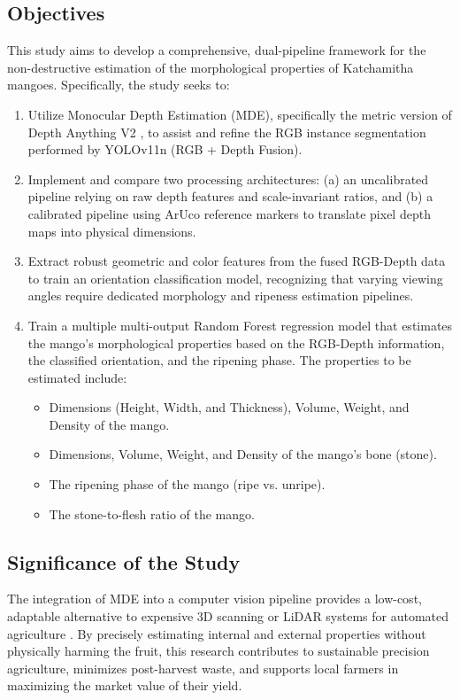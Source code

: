 \subsection{Objectives}
This study aims to develop a comprehensive, dual-pipeline framework for the non-destructive estimation of the morphological properties of Katchamitha mangoes. Specifically, the study seeks to:
\begin{enumerate}
    \item Utilize Monocular Depth Estimation (MDE), specifically the metric version of
    Depth Anything V2 \cite{depth_anything_v2}, to assist and refine the RGB instance
    segmentation performed by YOLOv11n (RGB + Depth Fusion).
    \item Implement and compare two processing architectures: (a) an uncalibrated
    pipeline relying on raw depth features and scale-invariant ratios, and (b) a
    calibrated pipeline using ArUco reference markers to translate pixel depth maps
    into physical dimensions.
    \item Extract robust geometric and color features from the fused RGB-Depth data
    to train an orientation classification model, recognizing that varying viewing
    angles require dedicated morphology and ripeness estimation pipelines.
    \item Train a multiple multi-output Random Forest regression model that
    estimates the mango's morphological properties based on the RGB-Depth
    information, the classified orientation, and the ripening phase. The
    properties to be estimated include:
    \begin{itemize}
        \item Dimensions (Height, Width, and Thickness), Volume, Weight, and Density of the mango.
        \item Dimensions, Volume, Weight, and Density of the mango's bone (stone).
        \item The ripening phase of the mango (ripe vs. unripe).
        \item The stone-to-flesh ratio of the mango.
    \end{itemize}
\end{enumerate}

\subsection{Significance of the Study}
The integration of MDE into a computer vision pipeline provides a low-cost,
adaptable alternative to expensive 3D scanning or LiDAR systems for automated
agriculture \cite{depthanythingv2}. By precisely estimating internal and external
properties without physically harming the fruit, this research contributes to
sustainable precision agriculture, minimizes post-harvest waste, and supports
local farmers in maximizing the market value of their yield.


